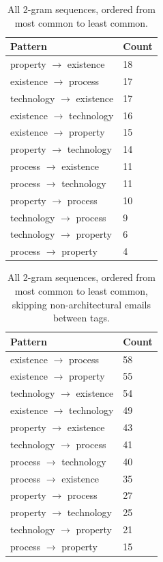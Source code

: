 \documentclass[a4paper, 12pt]{article}
\begin{document}
		\begin{table}[H]
			\centering
			\caption{All 2-gram sequences, ordered from most common to least common.}
			\begin{tabular}{|l|l|}
				\hline
				\textbf{Pattern} & \textbf{Count} \\ \hline
				property    $ \rightarrow $ existence   & 18 \\ \hline
				existence   $ \rightarrow $ process     & 17 \\ \hline
				technology  $ \rightarrow $ existence   & 17 \\ \hline
				existence   $ \rightarrow $ technology  & 16 \\ \hline
				existence   $ \rightarrow $ property    & 15 \\ \hline
				property    $ \rightarrow $ technology  & 14 \\ \hline
				process     $ \rightarrow $ existence   & 11 \\ \hline
				process     $ \rightarrow $ technology  & 11 \\ \hline
				property    $ \rightarrow $ process     & 10 \\ \hline
				technology  $ \rightarrow $ process     & 9 \\ \hline
				technology  $ \rightarrow $ property    & 6 \\ \hline
				process     $ \rightarrow $ property    & 4 \\ \hline
			\end{tabular}
		\end{table}
		
		\begin{table}[H]
			\centering
			\caption{All 2-gram sequences, ordered from most common to least common, skipping non-architectural emails between tags.}
			\begin{tabular}{|l|l|}
				\hline
				\textbf{Pattern} & \textbf{Count} \\ \hline
				existence   $ \rightarrow $ process     & 58 \\ \hline
				existence   $ \rightarrow $ property    & 55 \\ \hline
				technology  $ \rightarrow $ existence   & 54 \\ \hline
				existence   $ \rightarrow $ technology  & 49 \\ \hline
				property    $ \rightarrow $ existence   & 43 \\ \hline
				technology  $ \rightarrow $ process     & 41 \\ \hline
				process     $ \rightarrow $ technology  & 40 \\ \hline
				process     $ \rightarrow $ existence   & 35 \\ \hline
				property    $ \rightarrow $ process     & 27 \\ \hline
				property    $ \rightarrow $ technology  & 25 \\ \hline
				technology  $ \rightarrow $ property    & 21 \\ \hline
				process     $ \rightarrow $ property    & 15 \\ \hline
			\end{tabular}
		\end{table}
	
\end{document}
